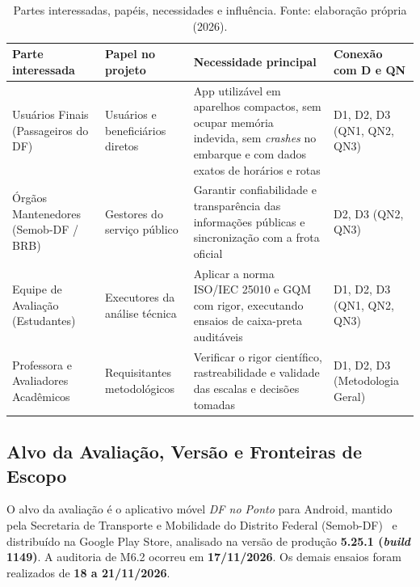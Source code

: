 \documentclass[11pt,a4paper]{article}
\begin{document}
\begin{table}[!htbp]
\centering
\caption{Partes interessadas, papéis, necessidades e influência. Fonte: elaboração própria (2026).}
\label{tab:stakeholders}
\scriptsize
\renewcommand{\arraystretch}{0.92}
\begin{tabularx}{\textwidth}{>{\raggedright\arraybackslash}p{2.6cm} >{\raggedright\arraybackslash}p{2.3cm} X >{\raggedright\arraybackslash}p{2.5cm}}
\toprule
\textbf{Parte interessada} & \textbf{Papel no projeto} & \textbf{Necessidade principal} & \textbf{Conexão com D e QN} \\
\midrule
Usuários Finais (Passageiros do DF) & Usuários e beneficiários diretos & App utilizável em aparelhos compactos, sem ocupar memória indevida, sem \textit{crashes} no embarque e com dados exatos de horários e rotas & D1, D2, D3 \newline (QN1, QN2, QN3) \\
\addlinespace[0.1em]
Órgãos Mantenedores (Semob-DF / BRB) & Gestores do serviço público & Garantir confiabilidade e transparência das informações públicas e sincronização com a frota oficial & D2, D3 \newline (QN2, QN3) \\
\addlinespace[0.1em]
Equipe de Avaliação (Estudantes) & Executores da análise técnica & Aplicar a norma ISO/IEC 25010 e GQM com rigor, executando ensaios de caixa-preta auditáveis & D1, D2, D3 \newline (QN1, QN2, QN3) \\
\addlinespace[0.1em]
Professora e Avaliadores Acadêmicos & Requisitantes metodológicos & Verificar o rigor científico, rastreabilidade e validade das escalas e decisões tomadas & D1, D2, D3 \newline (Metodologia Geral) \\
\bottomrule
\end{tabularx}
\end{table}

\subsection{Alvo da Avaliação, Versão e Fronteiras de Escopo}
\label{sec:escopo_produto}

O alvo da avaliação é o aplicativo móvel \textit{DF no Ponto} para Android, mantido pela Secretaria de Transporte e Mobilidade do Distrito Federal (Semob-DF)~\cite{semob2026} e distribuído na Google Play Store, analisado na versão de produção \textbf{5.25.1 (\textit{build} 1149)}. A auditoria de M6.2 ocorreu em \textbf{17/11/2026}. Os demais ensaios foram realizados de \textbf{18 a 21/11/2026}.
\end{document}
